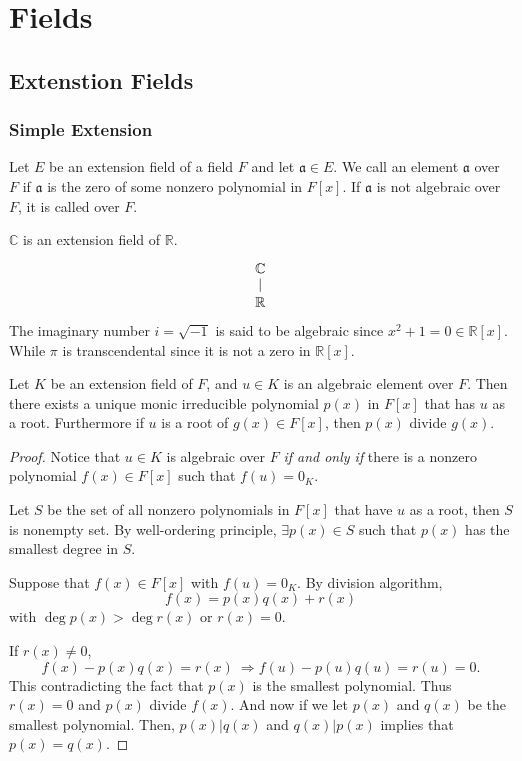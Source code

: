 \chapter{Fields}

\section{Extenstion Fields}

\subsection{Simple Extension}

\begin{definition}
    Let $E$ be an extension field of a field $F$ and let $\mathfrak{a} \in E$. We call an element 
    $\mathfrak{a}$  over $F$ if $\mathfrak{a}$ is the zero of some nonzero 
    polynomial in $F[x]$. If $\mathfrak{a}$ is not algebraic over $F$, it is called 
     over $F$.
\end{definition}

\begin{example}
    $\mathbb{C}$ is an extension field of $\mathbb{R}$.
    \[
        \begin{tikzcd}[row sep=1.0em]
            \mathbb{C} \arrow[dash]{d}\\
            \mathbb{R}
        \end{tikzcd}
    \]
    The imaginary number $i = \sqrt{-1}$ is said to be algebraic since $x^2 + 1 = 0 \in \mathbb{R}[x]$. While 
    $\pi$ is transcendental since it is not a zero in $\mathbb{R}[x]$.
\end{example}

\begin{theorem}
    Let $K$ be an extension field of $F$, and $u \in K$ is an algebraic element over $F$. Then there exists 
    a unique monic irreducible polynomial $p(x)$ in $F[x]$ that has $u$ as a root. 
    Furthermore if $u$ is a root of $g(x) \in F[x]$, then $p(x)$ divide $g(x)$.
\end{theorem}
\begin{proof}
    Notice that $u \in K$ is algebraic over $F$ \textit{if and only if} there is a nonzero polynomial 
    $f(x) \in F[x]$ such that $f(u) = 0_K$.

    Let $S$ be the set of all nonzero polynomials in $F[x]$ that have $u$ as a root, then $S$ is nonempty set.
    By well-ordering principle, $\exists p(x) \in S$ such that $p(x)$ has the smallest degree in $S$.

    Suppose that $f(x) \in F[x]$ with $f(u) = 0_K$. By division algorithm, 
    \[
        f(x) = p(x) q(x) + r(x)
    \]
    with $\deg p(x) > \deg r(x)$ or $r(x) = 0$.

    If $r(x) \neq 0$, 
    \[
        f(x) - p(x) q(x) = r(x) \> \Longrightarrow f(u) - p(u) q(u) = r(u) = 0.
    \]
    This contradicting the fact that $p(x)$ is the smallest polynomial. Thus $r(x) = 0$ and 
    $p(x)$ divide $f(x)$. And now if we let $p(x)$ and $q(x)$ be the smallest polynomial. Then, 
    $p(x) | q(x)$ and $q(x) | p(x)$ implies that $p(x) = q(x)$.
\end{proof}

